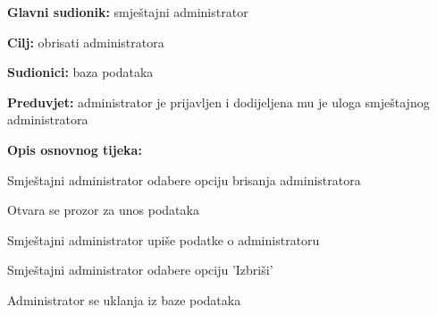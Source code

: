                         \noindent {}
					\begin{packed_item}
	
						\item \textbf{Glavni sudionik: }smještajni administrator
						\item  \textbf{Cilj:} obrisati administratora
						\item  \textbf{Sudionici:} baza podataka
						\item  \textbf{Preduvjet:} administrator je prijavljen i dodijeljena mu je uloga smještajnog administratora
						\item  \textbf{Opis osnovnog tijeka:}
						
						\item[] \begin{packed_enum}
	
							\item Smještajni administrator odabere opciju brisanja administratora
							\item Otvara se prozor za unos podataka
							\item Smještajni administrator upiše podatke o administratoru
							\item Smještajni administrator odabere opciju 'Izbriši'
							\item Administrator se uklanja iz baze podataka
						\end{packed_enum}
					
					\end{packed_item}

